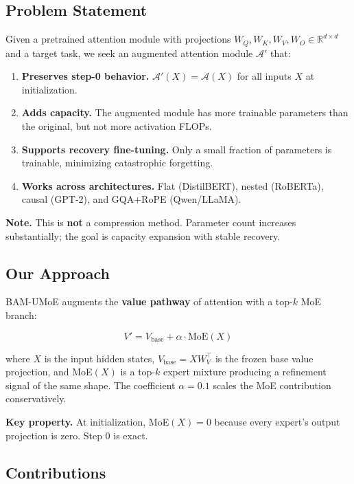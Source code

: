 \subsection{Problem Statement}

Given a pretrained attention module with projections 
$W_Q, W_K, W_V, W_O \in \mathbb{R}^{d \times d}$ and a target task, we seek 
an augmented attention module $\mathcal{A}'$ that:

\begin{enumerate}
\item \textbf{Preserves step-0 behavior.} $\mathcal{A}'(X) = \mathcal{A}(X)$ for
  all inputs $X$ at initialization.
\item \textbf{Adds capacity.} The augmented module has more trainable parameters
  than the original, but not more activation FLOPs.
\item \textbf{Supports recovery fine-tuning.} Only a small fraction of parameters
  is trainable, minimizing catastrophic forgetting.
\item \textbf{Works across architectures.} Flat (DistilBERT), nested (RoBERTa),
  causal (GPT-2), and GQA+RoPE (Qwen/LLaMA).

\end{enumerate}
\textbf{Note.} This is \textbf{not} a compression method. Parameter count increases 
substantially; the goal is capacity expansion with stable recovery.

\subsection{Our Approach}

BAM-UMoE augments the \textbf{value pathway} of attention with a top-$k$ MoE 
branch:

\[
V' = V_{\text{base}} + \alpha \cdot \text{MoE}(X)
\]

where $X$ is the input hidden states, $V_\text{base} = X W_V^\top$ is the 
frozen base value projection, and MoE$(X)$ is a top-$k$ expert mixture 
producing a refinement signal of the same shape. The coefficient $\alpha = 0.1$ 
scales the MoE contribution conservatively.

\textbf{Key property.} At initialization, MoE$(X) = 0$ because every expert's 
output projection is zero. Step 0 is exact.

\subsection{Contributions}

